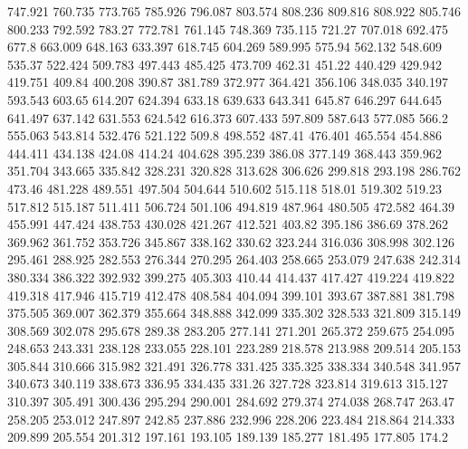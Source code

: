 747.921      760.735      773.765      785.926      796.087      803.574      808.236      809.816      808.922      805.746      800.233      792.592      783.27      772.781      761.145      748.369      735.115      721.27      707.018      692.475      677.8      663.009      648.163      633.397      618.745      604.269      589.995      575.94      562.132      548.609      535.37      522.424      509.783      497.443      485.425      473.709      462.31      451.22      440.429      429.942      419.751      409.84      400.208      390.87      381.789      372.977      364.421      356.106      348.035      340.197      
593.543      603.65      614.207      624.394      633.18      639.633      643.341      645.87      646.297      644.645      641.497      637.142      631.553      624.542      616.373      607.433      597.809      587.643      577.085      566.2      555.063      543.814      532.476      521.122      509.8      498.552      487.41      476.401      465.554      454.886      444.411      434.138      424.08      414.24      404.628      395.239      386.08      377.149      368.443      359.962      351.704      343.665      335.842      328.231      320.828      313.628      306.626      299.818      293.198      286.762      
473.46      481.228      489.551      497.504      504.644      510.602      515.118      518.01      519.302      519.23      517.812      515.187      511.411      506.724      501.106      494.819      487.964      480.505      472.582      464.39      455.991      447.424      438.753      430.028      421.267      412.521      403.82      395.186      386.69      378.262      369.962      361.752      353.726      345.867      338.162      330.62      323.244      316.036      308.998      302.126      295.461      288.925      282.553      276.344      270.295      264.403      258.665      253.079      247.638      242.314      
380.334      386.322      392.932      399.275      405.303      410.44      414.437      417.427      419.224      419.822      419.318      417.946      415.719      412.478      408.584      404.094      399.101      393.67      387.881      381.798      375.505      369.007      362.379      355.664      348.888      342.099      335.302      328.533      321.809      315.149      308.569      302.078      295.678      289.38      283.205      277.141      271.201      265.372      259.675      254.095      248.653      243.331      238.128      233.055      228.101      223.289      218.578      213.988      209.514      205.153      
305.844      310.666      315.982      321.491      326.778      331.425      335.325      338.334      340.548      341.957      340.673      340.119      338.673      336.95      334.435      331.26      327.728      323.814      319.613      315.127      310.397      305.491      300.436      295.294      290.001      284.692      279.374      274.038      268.747      263.47      258.205      253.012      247.897      242.85      237.886      232.996      228.206      223.484      218.864      214.333      209.899      205.554      201.312      197.161      193.105      189.139      185.277      181.495      177.805      174.2      
